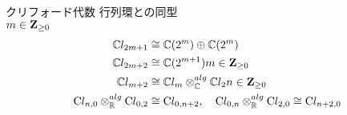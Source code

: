 \documentclass{jlreq}
\begin{document}
クリフォード代数 行列環との同型 \\

$m\in\mathbf{Z}_{\geq 0} \\$
\begin{align}
\mathbb{C}l_{2m+1} &\cong \mathbb{C}({2^{m}}) \oplus \mathbb{C}({2^{m}}) \\
\mathbb{C}l_{2m+2} &\cong \mathbb{C}({2^{m+1}})
m\in\mathbf{Z}_{\geq 0} \\
    \mathbb{C}l_{m+2} &\cong \mathbb{C}l_{m} \otimes^{alg}_{\mathbb{C}} \mathbb{C}l_{2}
    n\in\mathbf{Z}_{\geq 0} \\
        \text{C}l_{n,0} \otimes^{alg}_{\mathbb{R}} \text{C}l_{0,2} &\cong \text{C}l_{0,n+2},
        \quad
        \text{C}l_{0,n} \otimes^{alg}_{\mathbb{R}} \text{C}l_{2,0} \cong \text{C}l_{n+2,0}
\end{align}
\end{document}
